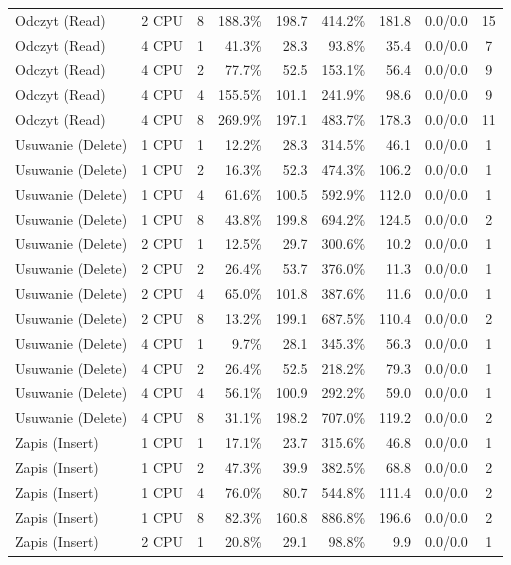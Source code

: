 \begin{table}[ht]
{\begin{tabular}{llcrrrrcc}
Odczyt (Read) & 2 CPU & 8 & 188.3\% & 198.7 & 414.2\% & 181.8 & 0.0/0.0 & 15 \\
Odczyt (Read) & 4 CPU & 1 & 41.3\% & 28.3 & 93.8\% & 35.4 & 0.0/0.0 & 7 \\
Odczyt (Read) & 4 CPU & 2 & 77.7\% & 52.5 & 153.1\% & 56.4 & 0.0/0.0 & 9 \\
Odczyt (Read) & 4 CPU & 4 & 155.5\% & 101.1 & 241.9\% & 98.6 & 0.0/0.0 & 9 \\
Odczyt (Read) & 4 CPU & 8 & 269.9\% & 197.1 & 483.7\% & 178.3 & 0.0/0.0 & 11 \\
Usuwanie (Delete) & 1 CPU & 1 & 12.2\% & 28.3 & 314.5\% & 46.1 & 0.0/0.0 & 1 \\
Usuwanie (Delete) & 1 CPU & 2 & 16.3\% & 52.3 & 474.3\% & 106.2 & 0.0/0.0 & 1 \\
Usuwanie (Delete) & 1 CPU & 4 & 61.6\% & 100.5 & 592.9\% & 112.0 & 0.0/0.0 & 1 \\
Usuwanie (Delete) & 1 CPU & 8 & 43.8\% & 199.8 & 694.2\% & 124.5 & 0.0/0.0 & 2 \\
Usuwanie (Delete) & 2 CPU & 1 & 12.5\% & 29.7 & 300.6\% & 10.2 & 0.0/0.0 & 1 \\
Usuwanie (Delete) & 2 CPU & 2 & 26.4\% & 53.7 & 376.0\% & 11.3 & 0.0/0.0 & 1 \\
Usuwanie (Delete) & 2 CPU & 4 & 65.0\% & 101.8 & 387.6\% & 11.6 & 0.0/0.0 & 1 \\
Usuwanie (Delete) & 2 CPU & 8 & 13.2\% & 199.1 & 687.5\% & 110.4 & 0.0/0.0 & 2 \\
Usuwanie (Delete) & 4 CPU & 1 & 9.7\% & 28.1 & 345.3\% & 56.3 & 0.0/0.0 & 1 \\
Usuwanie (Delete) & 4 CPU & 2 & 26.4\% & 52.5 & 218.2\% & 79.3 & 0.0/0.0 & 1 \\
Usuwanie (Delete) & 4 CPU & 4 & 56.1\% & 100.9 & 292.2\% & 59.0 & 0.0/0.0 & 1 \\
Usuwanie (Delete) & 4 CPU & 8 & 31.1\% & 198.2 & 707.0\% & 119.2 & 0.0/0.0 & 2 \\
Zapis (Insert) & 1 CPU & 1 & 17.1\% & 23.7 & 315.6\% & 46.8 & 0.0/0.0 & 1 \\
Zapis (Insert) & 1 CPU & 2 & 47.3\% & 39.9 & 382.5\% & 68.8 & 0.0/0.0 & 2 \\
Zapis (Insert) & 1 CPU & 4 & 76.0\% & 80.7 & 544.8\% & 111.4 & 0.0/0.0 & 2 \\
Zapis (Insert) & 1 CPU & 8 & 82.3\% & 160.8 & 886.8\% & 196.6 & 0.0/0.0 & 2 \\
Zapis (Insert) & 2 CPU & 1 & 20.8\% & 29.1 & 98.8\% & 9.9 & 0.0/0.0 & 1 \\

\end{tabular}}
\end{table}

